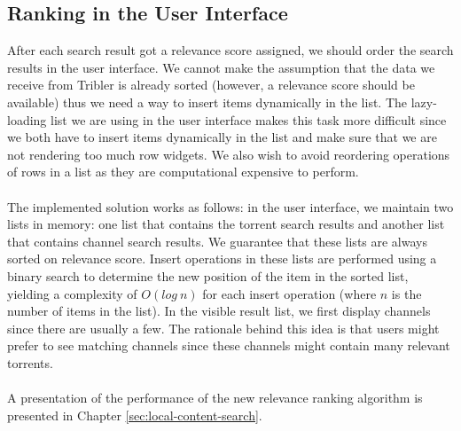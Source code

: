 \subsection{Ranking in the User Interface}
After each search result got a relevance score assigned, we should order the search results in the user interface. We cannot make the assumption that the data we receive from Tribler is already sorted (however, a relevance score should be available) thus we need a way to insert items dynamically in the list. The lazy-loading list we are using in the user interface makes this task more difficult since we both have to insert items dynamically in the list and make sure that we are not rendering too much row widgets. We also wish to avoid reordering operations of rows in a list as they are computational expensive to perform.\\\\
The implemented solution works as follows: in the user interface, we maintain two lists in memory: one list that contains the torrent search results and another list that contains channel search results. We guarantee that these lists are always sorted on relevance score. Insert operations in these lists are performed using a binary search to determine the new position of the item in the sorted list, yielding a complexity of $ O(log\ n) $ for each insert operation (where $ n $ is the number of items in the list). In the visible result list, we first display channels since there are usually a few. The rationale behind this idea is that users might prefer to see matching channels since these channels might contain many relevant torrents.\\\\
A presentation of the performance of the new relevance ranking algorithm is presented in Chapter \ref{sec:local-content-search}.

